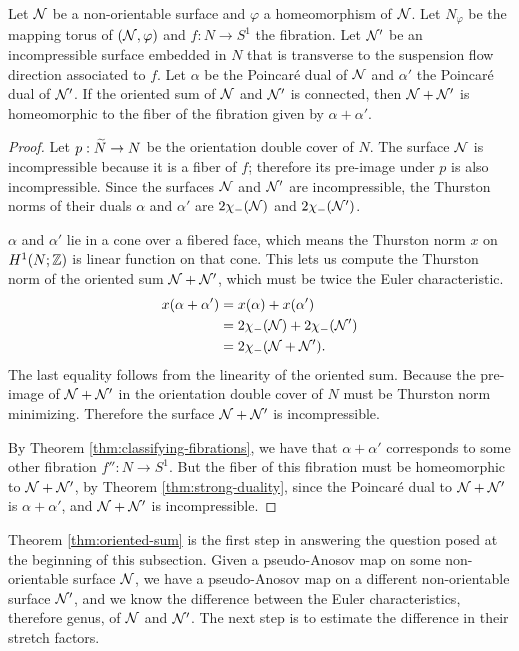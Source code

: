 \begin{thm}
  \label{thm:oriented-sum}
  Let $\mathcal{N}$ be a non-orientable surface and $\varphi$ a homeomorphism of $\mathcal{N}$.
  Let $N_\varphi$ be the mapping torus of $(\mathcal{N},\varphi)$ and $f:N\rightarrow S^1$ the fibration.
  Let $\mathcal{N}'$ be an incompressible surface embedded in $N$ that is transverse to the suspension flow direction associated to $f$.
  Let $\alpha$ be the Poincar\'e dual of $\mathcal{N}$ and $\alpha'$ the Poincar\'e dual of $\mathcal{N}'$.
  If the oriented sum of $\mathcal{N}$ and $\mathcal{N}'$ is connected, then $\mathcal{N} + \mathcal{N}'$ is homeomorphic to the fiber of the fibration given by $\alpha + \alpha'$.
\end{thm}
\begin{proof}
  Let $p:\widetilde{N}\rightarrow N$ be the orientation double cover of $N$.
  The surface $\mathcal{N}$ is incompressible because it is a fiber of $f$; therefore its pre-image under $p$ is also incompressible.
  Since the surfaces $\mathcal{N}$ and $\mathcal{N}'$ are incompressible, the Thurston norms of  their duals $\alpha$ and $\alpha'$ are $2\chi_-(\mathcal{N})$ and $2\chi_{-}(\mathcal{N}')$.

  $\alpha$ and $\alpha'$ lie in a cone over a fibered face, which means the Thurston norm $x$ on $H^1(N;\mathbb{Z})$ is linear function on that cone.
  This lets us compute the Thurston norm of the oriented sum $\mathcal{N} + \mathcal{N}'$, which must be twice the Euler characteristic.
  \begin{align*}
    x(\alpha + \alpha') &= x(\alpha) + x(\alpha') \\
                        &= 2\chi_-(\mathcal{N}) + 2\chi_-(\mathcal{N}') \\
                        &= 2\chi_-(\mathcal{N} + \mathcal{N}').
  \end{align*}
  The last equality follows from the linearity of the oriented sum.
  Because the pre-image of $\mathcal{N} + \mathcal{N}'$ in the orientation double cover of $N$ must be Thurston norm minimizing.
  Therefore the surface $\mathcal{N}+\mathcal{N}'$ is incompressible.

  By Theorem \ref{thm:classifying-fibrations}, we have that $\alpha + \alpha'$ corresponds to some other fibration $f'':N\rightarrow S^1$.
  But the fiber of this fibration must be homeomorphic to $\mathcal{N} + \mathcal{N}'$, by Theorem \ref{thm:strong-duality}, since the Poincar\'e dual to $\mathcal{N} + \mathcal{N}'$ is $\alpha + \alpha'$, and $\mathcal{N} + \mathcal{N}'$ is incompressible.
\end{proof}

Theorem \ref{thm:oriented-sum} is the first step in answering the question posed at the beginning of this subsection.
Given a pseudo-Anosov map on some non-orientable surface $\mathcal{N}$, we have a pseudo-Anosov map on a different non-orientable surface $\mathcal{N}'$, and we know the difference between the Euler characteristics, therefore genus, of $\mathcal{N}$ and $\mathcal{N}'$.
The next step is to estimate the difference in their stretch factors.

